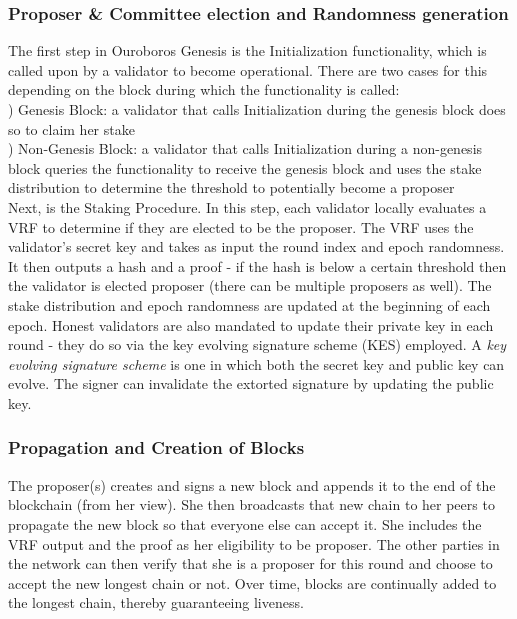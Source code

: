 \documentclass[10pt,journal,compsoc]{IEEEtran}
\begin{document}
\subsubsection{Proposer \& Committee election and Randomness generation}
The first step in Ouroboros Genesis is the Initialization functionality, which is called upon by a validator to become operational. There are two cases for this depending on the block during which the functionality is called:
\\
) Genesis Block: a validator that calls Initialization \indent during the genesis block does so to claim her stake
\\
) Non-Genesis Block: a validator that calls Initialization \indent during a non-genesis block queries the functionality to \indent receive the genesis block and uses the stake distribution \indent to determine the threshold to potentially become a proposer
\\
Next, is the Staking Procedure. In this step, each validator locally evaluates a VRF to determine if they are elected to be the proposer. The VRF uses the validator’s secret key and takes as input the round index and epoch randomness. It then outputs a hash and a proof - if the hash is below a certain threshold then the validator is elected proposer (there can be multiple proposers as well). The stake distribution and epoch randomness are updated at the beginning of each epoch. Honest validators are also mandated to update their private key in each round - they do so via the key evolving signature scheme (KES) employed. A \emph{key evolving signature scheme} is one in which both the secret key and public key can evolve. The signer can invalidate the extorted signature by updating the public key. \cite{ItkisXie}

\subsubsection{Propagation and Creation of Blocks}
The proposer(s) creates and signs a new block and appends it to the end of the blockchain (from her view). She then broadcasts that new chain to her peers to propagate the new block so that everyone else can accept it. She includes the VRF output and the proof as her eligibility to be proposer. The other parties in the network can then verify that she is a proposer for this round and choose to accept the new longest chain or not. Over time, blocks are continually added to the longest chain, thereby guaranteeing liveness.
\end{document}
